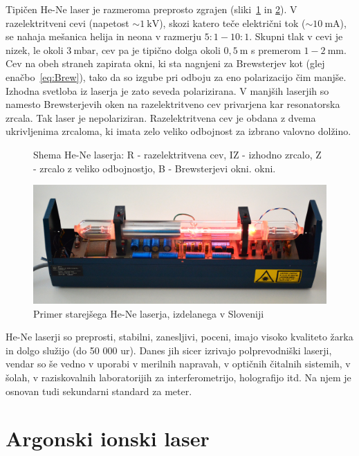 Tipičen He-Ne laser je razmeroma preprosto zgrajen (sliki~\ref{fig:HeNeShema}
in \ref{fig:Iskra}). 
V razelektritveni cevi (napetost  $\sim 1~\si{\kilo\volt}$), skozi
katero teče električni tok ($\sim 10~\si{\milli\ampere}$), 
se nahaja mešanica helija in neona v razmerju 
$5:1 - 10:1$. Skupni tlak v cevi je nizek, le okoli $3~\si{\milli\bar}$, 
cev pa je tipično dolga okoli $0,5~\si{\metre}$ s premerom $1-2~\si{\milli\metre}$.  
Cev na obeh straneh zapirata okni, ki sta nagnjeni za Brewsterjev kot (glej enačbo~\ref{eq:Brew}), 
tako da so izgube pri odboju za eno polarizacijo čim manjše.
Izhodna svetloba iz laserja je zato seveda polarizirana. V manjših laserjih
so namesto Brewsterjevih oken na razelektritveno cev privarjena kar
resonatorska zrcala. Tak laser je nepolariziran. 
Razelektritvena cev je obdana z dvema ukrivljenima zrcaloma, 
ki imata zelo veliko odbojnost za izbrano valovno dolžino.
\begin{figure}[h]
\centering
\def\svgwidth{100truemm} 

\caption{Shema He-Ne laserja: R - razelektritvena cev, IZ - izhodno zrcalo, Z - zrcalo
z veliko odbojnostjo, B - Brewsterjevi okni.
okni.}
\label{fig:HeNeShema}
\end{figure}

\begin{figure}[h]
\centering
\includegraphics[width=130truemm]{slike/07_HeNe.jpg}
\caption{Primer starejšega He-Ne laserja, izdelanega v Sloveniji}
\label{fig:Iskra}
\end{figure}

He-Ne laserji so preprosti, stabilni, zanesljivi, poceni, imajo visoko kvaliteto žarka
in dolgo služijo (do 50 000 ur).
Danes jih sicer izrivajo polprevodniški laserji, vendar so še vedno v uporabi
v merilnih napravah, v optičnih čitalnih sistemih, v šolah, v raziskovalnih 
laboratorijih za interferometrijo, holografijo itd. Na njem je osnovan tudi 
sekundarni standard za meter.

\section{Argonski ionski laser}


